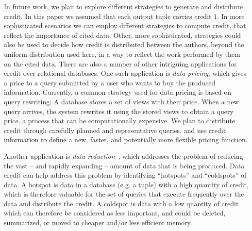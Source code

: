 In future work, we plan to explore different strategies to generate and distribute credit. In this paper we assumed that each output tuple carries credit $1$. In more sophisticated scenarios we can employ different strategies to compute credit, that reflect the importance of cited data.
Other, more sophisticated, strategies could also be used to decide how credit is distributed between the authors, beyond the uniform distribution used here, in a way to reflect the work performed by them on the cited data.  
There are also a number of other intriguing applications for credit over relational databases.
One such application is \emph{data pricing}, which gives a price to a query submitted by a user who wants to buy the produced information. Currently, a common strategy used for data pricing is based on query rewriting:  A database stores a set of views with their price. When a new query arrives, the system rewrites it using the stored views to obtain a query price, a process that can be computationally expensive.
We plan to distribute credit through carefully planned and representative queries, and use credit information to define a new, faster, and potentially more flexible pricing function.

Another application is \emph{data reduction}~\cite{milo2019getting}, which addresses the problem of reducing the vast -- and rapidly expanding -- amount of data that is being produced. %
Data credit can help address this problem by identifying ``hotspots'' and ``coldspots'' of data. A hotspot is data in a database (e.g. a tuple) with a high quantity of credit, which is therefore valuable for the set of queries that execute frequently over the data and distribute the credit. 
A coldspot is data with a low quantity of credit which can therefore be considered as less  important, and could be deleted, summarized, or moved to cheaper and/or less efficient memory. 


